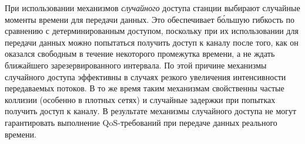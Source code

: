 При использовании механизмов \textit{случайного} доступа станции выбирают случайные моменты времени для передачи данных. Это обеспечивает б\'{о}льшую гибкость по сравнению с детерминированным доступом, поскольку при их использовании для передачи данных можно попытаться получить доступ к каналу после того, как он оказался свободным в течение некоторого промежутка времени, а не ждать ближайшего зарезервированного интервала. По этой причине механизмы случайного доступа эффективны в случаях резкого увеличения интенсивности передаваемых потоков. В то же время таким механизмам свойственны частые коллизии (особенно в плотных сетях) и случайные задержки при попытках получить доступ к каналу. В результате механизмы случайного доступа не могут гарантировать выполнение QoS-требований при передаче данных реального времени. 





